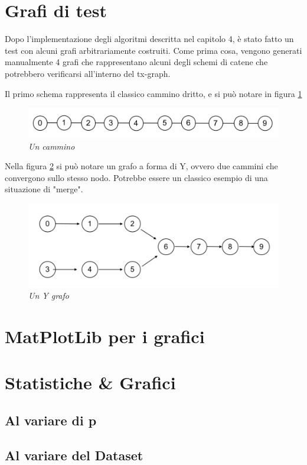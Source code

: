 \section{Grafi di test}
Dopo l'implementazione degli algoritmi descritta nel capitolo 4, è stato fatto un test con alcuni grafi arbitrariamente costruiti. Come prima cosa, vengono generati manualmente 4 grafi che rappresentano alcuni degli schemi di catene che potrebbero verificarsi all'interno del tx-graph.

Il primo schema rappresenta il classico cammino dritto, e si può notare in figura \ref{fig:straightgraph}
\begin{figure}[htbp]
	\centering
	\includegraphics[width = \linewidth]{figure/straightgraph}
	\caption{\textit{Un cammino}\label{fig:straightgraph}}
\end{figure}


Nella figura \ref{fig:ygraph} si può notare un grafo a forma di Y, ovvero due cammini che convergono sullo stesso nodo. Potrebbe essere un classico esempio di una situazione di "merge".
\begin{figure}[htbp]
	\centering
	\includegraphics[width = \linewidth]{figure/ygraph}
	\caption{\textit{Un Y grafo}\label{fig:ygraph}}
\end{figure}
\section{MatPlotLib per i grafici}
\section{Statistiche \& Grafici}
\subsection{Al variare di p}
\subsection{Al variare del Dataset}
